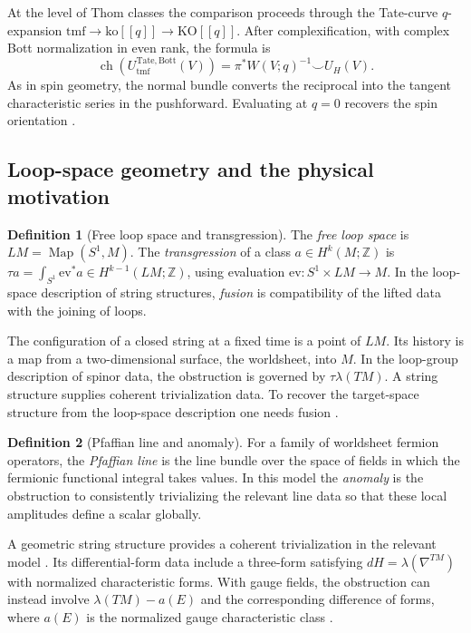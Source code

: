 \documentclass[11pt]{article}
\theoremstyle{definition}
\newtheorem{defn}{Definition}[section]
\newcommand{\KO}{\mathrm{KO}}
\newcommand{\tmf}{\mathrm{tmf}}
\newcommand{\ko}{\mathrm{ko}}
\newcommand{\ch}{\operatorname{ch}}
\newcommand{\Z}{\mathbb Z}
\begin{document}
At the level of Thom classes the comparison proceeds through the Tate-curve \(q\)-expansion \(\tmf\to\ko[[q]]\to\KO[[q]]\). After complexification, with complex Bott normalization in even rank, the formula is
\[
 \ch(U_{\tmf}^{\mathrm{Tate,Bott}}(V))
 =\pi^* W(V;q)^{-1}\smile U_H(V).
\]
As in spin geometry, the normal bundle converts the reciprocal into the tangent characteristic series in the pushforward. Evaluating at \(q=0\) recovers the spin orientation \cite{AHR,BN}.

\subsection{Loop-space geometry and the physical motivation}
\begin{defn}[Free loop space and transgression]
The \emph{free loop space} is \(LM=\operatorname{Map}(S^1,M)\). The \emph{transgression} of a class \(a\in H^k(M;\Z)\) is
\(\tau a=\int_{S^1}\mathrm{ev}^*a\in H^{k-1}(LM;\Z)\), using evaluation \(\mathrm{ev}:S^1\times LM\to M\). In the loop-space description of string structures, \emph{fusion} is compatibility of the lifted data with the joining of loops.
\end{defn}
The configuration of a closed string at a fixed time is a point of \(LM\). Its history is a map from a two-dimensional surface, the worldsheet, into \(M\). In the loop-group description of spinor data, the obstruction is governed by \(\tau\lambda(TM)\). A string structure supplies coherent trivialization data. To recover the target-space structure from the loop-space description one needs fusion \cite{Waldorf}.

\begin{defn}[Pfaffian line and anomaly]
For a family of worldsheet fermion operators, the \emph{Pfaffian line} is the line bundle over the space of fields in which the fermionic functional integral takes values. In this model the \emph{anomaly} is the obstruction to consistently trivializing the relevant line data so that these local amplitudes define a scalar globally.
\end{defn}
A geometric string structure provides a coherent trivialization in the relevant model \cite{Bunke}. Its differential-form data include a three-form satisfying \(dH=\lambda(\nabla^{TM})\) with normalized characteristic forms. With gauge fields, the obstruction can instead involve \(\lambda(TM)-a(E)\) and the corresponding difference of forms, where \(a(E)\) is the normalized gauge characteristic class \cite{SSS}.
\end{document}
